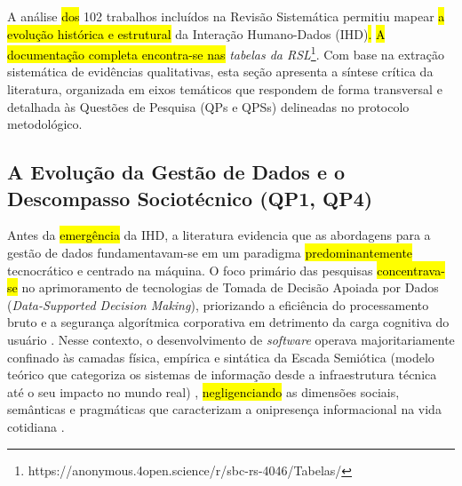 \documentclass[12pt]{article}
\newcommand{\hlcite}[1]{\colorbox{yellow}{\cite{#1}}} %
\begin{document}
A análise \hl{dos} 102 trabalhos incluídos na Revisão Sistemática permitiu mapear \hl{a evolução histórica e estrutural} da Interação Humano-Dados (IHD)\hl{.} \hl{A documentação completa encontra-se nas} \emph{tabelas da RSL}\footnote{https://anonymous.4open.science/r/sbc-rs-4046/Tabelas/}. Com base na extração sistemática de evidências qualitativas, esta seção apresenta a síntese crítica da literatura, organizada em eixos temáticos que respondem de forma transversal e detalhada às Questões de Pesquisa (QPs e QPSs) delineadas no protocolo metodológico.

\subsection{A Evolução da Gestão de Dados e o Descompasso Sociotécnico (QP1, QP4)}

    Antes da \hl{emergência} da IHD, a literatura evidencia que as abordagens para a gestão de dados fundamentavam-se em um paradigma \hl{predominantemente} tecnocrático e centrado na máquina. O foco primário das pesquisas \hl{concentrava-se} no aprimoramento de tecnologias de Tomada de Decisão Apoiada por Dados (\textit{Data-Supported Decision Making}), priorizando a eficiência do processamento bruto e a segurança algorítmica corporativa em detrimento da carga cognitiva do usuário \cite{calvetti2024human, Locoro2020}. Nesse contexto, o desenvolvimento de \textit{software} operava majoritariamente confinado às camadas física, empírica e sintática da Escada Semiótica (modelo teórico que categoriza os sistemas de informação desde a infraestrutura técnica até o seu impacto no mundo real) \hlcite{Hornung2015}, \hl{negligenciando} as dimensões sociais, semânticas e pragmáticas que caracterizam a onipresença informacional na vida cotidiana \cite{Strey2019Human}.
\end{document}
